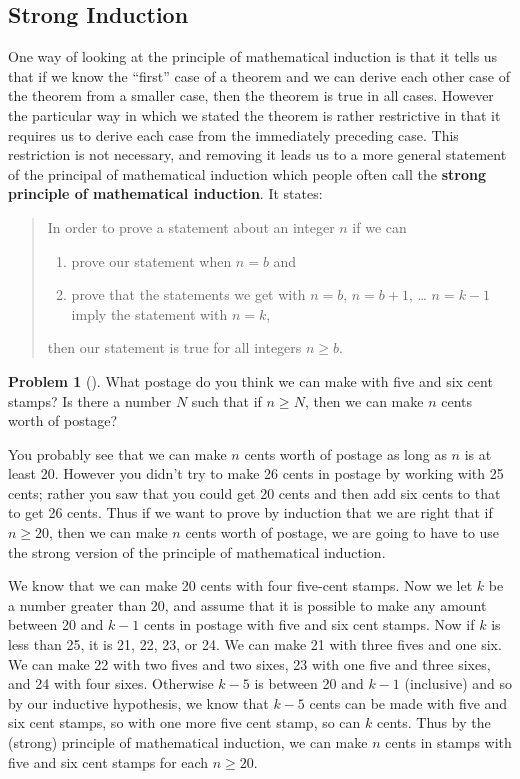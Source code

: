 \documentclass[10pt,]{book}
\newcommand{\terminology}[1]{\textbf{#1}}
\theoremstyle{plain}
\theoremstyle{definition}
\newtheorem{activity}[project]{Problem}
\theoremstyle{definition}
\numberwithin{equation}{chapter}
\begin{document}
\subsection[{Strong Induction}]{Strong Induction}\label{subsection-76}
One way of looking at the principle of mathematical induction is that it tells us that if we know the ``first'' case of a theorem and we can derive each other case of the theorem from a smaller case, then the theorem is true in all cases. However the particular way in which we stated the theorem is rather restrictive in that it requires us to derive each case from the immediately preceding case. This restriction is not necessary, and removing it leads us to a more general statement of the principal of mathematical induction which people often call the \terminology{strong principle of mathematical induction}. It states:%
\begin{quote}\hypertarget{blockquote-19}{}
In order to prove a statement about an integer \(n\) if we can \leavevmode%
\begin{enumerate}
\item\hypertarget{li-131}{}prove our statement when \(n=b\) and%
\item\hypertarget{li-132}{}prove that the statements we get with \(n=b\), \(n=b+1\), \dots{} \(n=k-1\) imply the statement with \(n=k\),%
\end{enumerate}
 then our statement is true for all integers \(n\ge b\).%
\end{quote}
\begin{activity}[]\marginsymbol[-1em]{} \label{activity-367}
What postage do you think we can make with five and six cent stamps? Is there a number \(N\) such that if \(n\ge N\), then we can make \(n\) cents worth of postage?%
\end{activity}
You probably see that we can make \(n\) cents worth of postage as long as \(n\) is at least 20. However you didn't try to make 26 cents in postage by working with 25 cents; rather you saw that you could get 20 cents and then add six cents to that to get 26 cents. Thus if we want to prove by induction that we are right that if \(n\ge 20\), then we can make \(n\) cents worth of postage, we are going to have to use the strong version of the principle of mathematical induction.%
\par
We know that we can make 20 cents with four five-cent stamps. Now we let \(k\) be a number greater than 20, and assume that it is possible to make any amount between 20 and \(k-1\) cents in postage with five and six cent stamps. Now if \(k\) is less than 25, it is 21, 22, 23, or 24. We can make 21 with three fives and one six. We can make 22 with two fives and two sixes, 23 with one five and three sixes, and 24 with four sixes. Otherwise \(k-5\) is between 20 and \(k-1\) (inclusive) and so by our inductive hypothesis, we know that \(k-5\) cents can be made with five and six cent stamps, so with one more five cent stamp, so can \(k\) cents. Thus by the (strong) principle of mathematical induction, we can make \(n\) cents in stamps with five and six cent stamps for each \(n\ge 20\).%
\end{document}
